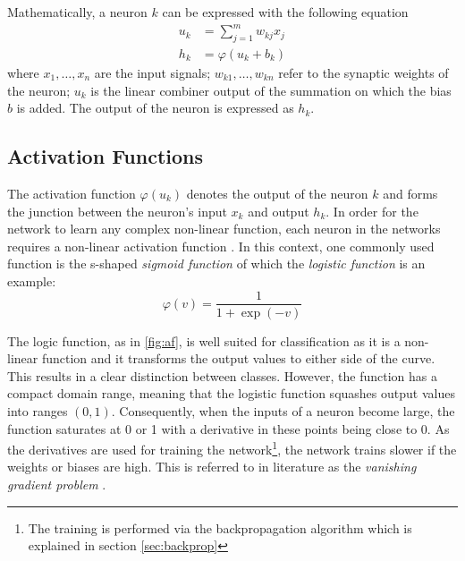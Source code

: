 Mathematically, a neuron $k$ can be expressed with the following equation \cite{Haykin:1998:NNC:521706}
\begin{eqnarray}
  u_k &= \sum_{j = 1}^{m}w_{kj}x_{j} \\
  h_k &= \varphi(u_k + b_k)
\end{eqnarray}
where $x_1, \dots, x_n$ are the input signals; $w_{k1}, \dots, w_{kn}$ refer to the synaptic weights of the neuron; $u_k$ is the linear combiner output of the summation on which the bias $b$ is added. The output of the neuron is expressed as $h_k$.

\subsection{Activation Functions}
The activation function $\varphi(u_k)$ denotes the output of the neuron $k$ and forms the junction between the neuron's input $x_k$ and output $h_k$. In order for the network to learn any complex non-linear function, each neuron in the networks requires a non-linear activation function \cite{Goodfellow-et-al-2016}. In this context, one commonly used function is the s-shaped \textit{sigmoid function} of which the \textit{logistic function} \cite{Haykin:1998:NNC:521706} is an example:\\

\begin{equation}
 \varphi(v) = \frac{1}{1 + \exp(-v)} 
\end{equation}

The logic function, as in \ref{fig:af}, is well suited for classification as it is a non-linear function and it transforms the output values to either side of the curve. This results in a clear distinction between classes. However, the function has a compact domain range, meaning that the logistic function squashes output values into ranges $(0, 1)$. Consequently, when the inputs of a neuron become large, the function saturates at 0 or 1 with a derivative in these points being close to 0. As the derivatives are used for training the network\footnote{The training is performed via the backpropagation algorithm which is explained in section \ref{sec:backprop}}, the network trains slower if the weights or biases are high. This is referred to in literature as the \textit{vanishing gradient problem} \cite{Nair:2010:RLU:3104322.3104425}.\\

